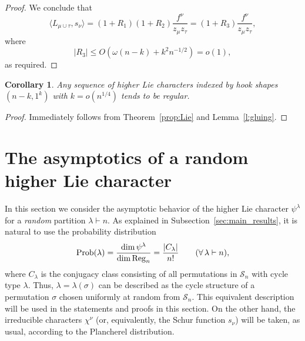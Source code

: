 \documentclass[12pt]%
{amsart}
\renewcommand\S{{\mathcal S}}
\DeclareMathOperator\Reg{Reg}
\newcommand{\la}{{\lambda}}
\newcommand{\si}{{\sigma}}
\newcommand{\om}{{\omega}}
\newcommand{\Prob}{{\rm Prob}}
\newcommand{\conj}{M_{\rm conj}}
\theoremstyle{plain}
\newtheorem{corollary}[theorem]{Corollary}
\theoremstyle{definition}
\theoremstyle{remark}
\begin{document}
\begin{proof}
We conclude that
\[
    \langle L_{\mu\cup\tau},s_\nu \rangle
    = (1 + R_1) (1+ R_2) \frac{f^\nu}{z_\mu z_\tau} 
    = (1 + R_3) \frac{f^\nu}{z_\mu z_\tau} ,
\]
where 
\[
    |R_3| \le O(\om(n-k) + k^2 n^{-1/2}) = o(1),
\]
as required.
\end{proof}

\begin{corollary}\label{cor:hooks}
Any sequence of higher Lie characters indexed by 
hook shapes $(n-k,1^k)$ with $k=o(n^{1/4})$ tends to be regular.    
\end{corollary}
\begin{proof}
    Immediately follows from Theorem~\ref{prop:Lie} and Lemma~\ref{l:gluing}.
\end{proof}



\section{The asymptotics of a random higher Lie character}\label{sec:asymp}


In this section we consider the asymptotic behavior of the higher Lie character $\psi^\la$ for a {\em random} partition $\la \vdash n$. 
As explained in Subsection~\ref{sec:main_results},
it is natural to use the probability distribution
\[
    \Prob(\la) 
    = \frac{\dim \psi^\la}{\dim \Reg_n}
    = \frac{|C_\la|}{n!}
    \qquad (\forall\,\la \vdash n),
\]
where $C_\la$ is the conjugacy class consisting of all permutations in $\S_n$ with cycle type $\la$.
Thus, $\la=\la(\si)$ can be described as the cycle structure of a permutation $\si$ chosen uniformly at random from $\S_n$. 
This equivalent description will be used in the statements and proofs in this section. 
On the other hand, the irreducible characters $\chi^\nu$ (or, equivalently, the Schur function $s_\nu$) will be taken, as usual, according to the Plancherel distribution.
\end{document}
